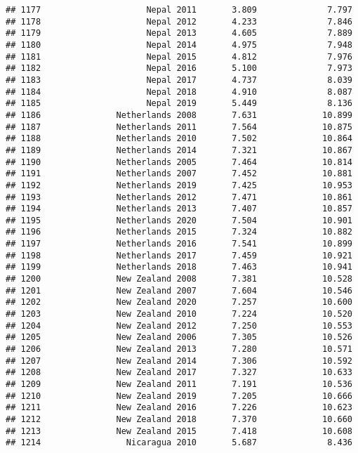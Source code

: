 \documentclass[
]{article}
\begin{document}
\begin{verbatim}
## 1177                     Nepal 2011       3.809              7.797
## 1178                     Nepal 2012       4.233              7.846
## 1179                     Nepal 2013       4.605              7.889
## 1180                     Nepal 2014       4.975              7.948
## 1181                     Nepal 2015       4.812              7.976
## 1182                     Nepal 2016       5.100              7.973
## 1183                     Nepal 2017       4.737              8.039
## 1184                     Nepal 2018       4.910              8.087
## 1185                     Nepal 2019       5.449              8.136
## 1186               Netherlands 2008       7.631             10.899
## 1187               Netherlands 2011       7.564             10.875
## 1188               Netherlands 2010       7.502             10.864
## 1189               Netherlands 2014       7.321             10.867
## 1190               Netherlands 2005       7.464             10.814
## 1191               Netherlands 2007       7.452             10.881
## 1192               Netherlands 2019       7.425             10.953
## 1193               Netherlands 2012       7.471             10.861
## 1194               Netherlands 2013       7.407             10.857
## 1195               Netherlands 2020       7.504             10.901
## 1196               Netherlands 2015       7.324             10.882
## 1197               Netherlands 2016       7.541             10.899
## 1198               Netherlands 2017       7.459             10.921
## 1199               Netherlands 2018       7.463             10.941
## 1200               New Zealand 2008       7.381             10.528
## 1201               New Zealand 2007       7.604             10.546
## 1202               New Zealand 2020       7.257             10.600
## 1203               New Zealand 2010       7.224             10.520
## 1204               New Zealand 2012       7.250             10.553
## 1205               New Zealand 2006       7.305             10.526
## 1206               New Zealand 2013       7.280             10.571
## 1207               New Zealand 2014       7.306             10.592
## 1208               New Zealand 2017       7.327             10.633
## 1209               New Zealand 2011       7.191             10.536
## 1210               New Zealand 2019       7.205             10.666
## 1211               New Zealand 2016       7.226             10.623
## 1212               New Zealand 2018       7.370             10.660
## 1213               New Zealand 2015       7.418             10.608
## 1214                 Nicaragua 2010       5.687              8.436

\end{verbatim}
\end{document}
